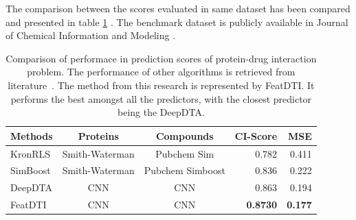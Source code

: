 The comparison between the scores evaluated in same dataset has been compared and presented in table \ref{table:results_comparison} \citep{ozturk2018deepdta}. The benchmark dataset is publicly available in Journal of Chemical Information and Modeling \citep{Tang2013}.

\begin{table} [H]
    \centering
    \caption[Results Comparison]{Comparison of performace in prediction scores of protein-drug interaction problem. The performance of other algorithms is retrieved from literature~\citep{ozturk2018deepdta}. The method from this research is represented by FeatDTI. It performs the best amongst all the predictors, with the closest predictor being the DeepDTA.}
    \label{table:results_comparison}
    \begin{tabular}{|l|c|c|r|r|}
        \hline
        
        Methods & Proteins & Compounds & CI-Score & MSE \\ \hline
        KronRLS & Smith-Waterman & Pubchem Sim & 0.782 & 0.411 \\ \hline
        SimBoost & Smith-Waterman & Pubchem Simboost & 0.836 & 0.222 \\ \hline
        DeepDTA & CNN & CNN & 0.863 & 0.194 \\ \hline
        FeatDTI & CNN & CNN & \textbf{0.8730} & \textbf{0.177} \\ \hline
        
        \end{tabular}
\end{table}

